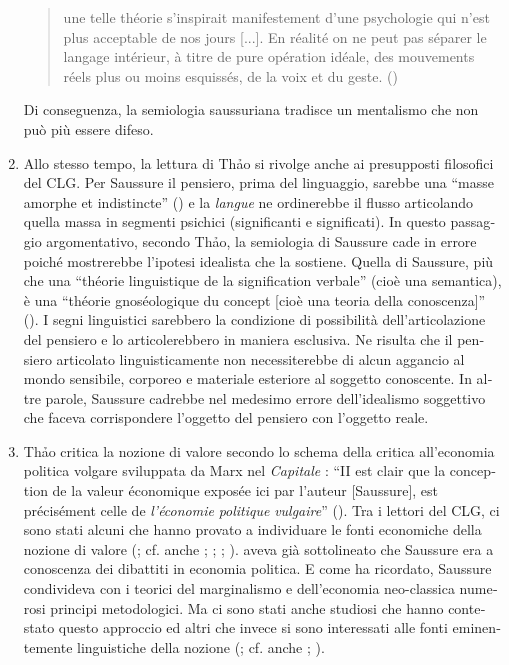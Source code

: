 \documentclass[output=paper]{langsci/langscibook}
\begin{document}
\begin{otherlanguage}{italian}
\begin{enumerate}
\begin{quote} 
    une telle théorie s’inspirait manifestement d’une psychologie qui n’est plus acceptable de nos jours [...]. En réalité on ne peut pas séparer le langage intérieur, à titre de pure opération idéale, des mouvements réels plus ou moins esquissés, de la voix et du geste. (\citealt[25--26]{thao_phenomenologie_1975})
\end{quote}
Di conseguenza, la semiologia saussuriana tradisce un mentalismo che non può più essere difeso.


\item Allo stesso tempo, la lettura di Th\textlatin{ả}o si rivolge anche ai presupposti filosofici del CLG. Per Saussure il pensiero, prima del linguaggio, sarebbe una “masse amorphe et indistincte” (\citealt[155]{saussure_cours_1995}) e la \textit{langue} ne ordinerebbe il flusso articolando quella massa in segmenti psichici (significanti e significati). In questo passaggio argomentativo, secondo Th\textlatin{ả}o, la semiologia di Saussure cade in errore poiché mostrerebbe l’ipotesi idealista che la sostiene. Quella di Saussure, più che una “théorie linguistique de la signification verbale” (cioè una semantica), è una “théorie gnoséologique du concept [cioè una teoria della conoscenza]” (\citealt[41]{thao_phenomenologie_1974}). I segni linguistici sarebbero la condizione di possibilità dell’articolazione del pensiero e lo articolerebbero in maniera esclusiva. Ne risulta che il pensiero articolato linguisticamente non necessiterebbe di alcun aggancio al mondo sensibile, corporeo e materiale esteriore al soggetto conoscente. In altre parole, Saussure cadrebbe nel medesimo errore dell’idealismo soggettivo che faceva corrispondere l’oggetto del pensiero con l’oggetto reale.

\item Th\textlatin{ả}o critica la nozione di valore secondo lo schema della critica all’economia politica volgare sviluppata da Marx nel \textit{Capitale} \citep{marx_kapital._1867}: “II est clair que la conception de la valeur économique exposée ici par l’auteur [Saussure], est précisément celle de \textit{l’économie} \textit{politique} \textit{vulgaire}” (\citealt[42]{thao_phenomenologie_1974}). Tra i lettori del CLG, ci sono stati alcuni che hanno provato a individuare le fonti economiche della nozione di valore (\citealt[68]{koerner_ferdinand_1973}; cf. anche \citealt[541]{sljusareva_notion_1980}; \citealt[2]{ponzio_valeur_2005}; \citealt{ponzio_linguistica_2015}; \citealt{joseph_saussures_2014}). \citet[n. 165]{de_mauro_note_2011} aveva già sottolineato che Saussure era a conoscenza dei dibattiti in economia politica. E come \citet{ponzio_valeur_2005} ha ricordato, Saussure condivideva con i teorici del marginalismo e dell’economia neo-classica numerosi principi metodologici. Ma ci sono stati anche studiosi che hanno contestato questo approccio \citep[235]{godel_les_1957} ed altri che invece si sono interessati alle fonti eminentemente linguistiche della nozione (\citealt[295]{auroux_deux_1985}; cf. anche \citealt[329]{swiggers_girard_1982}; \citealt{hasler_notion_2007}). 


\end{enumerate}
\end{otherlanguage}
\end{document}
